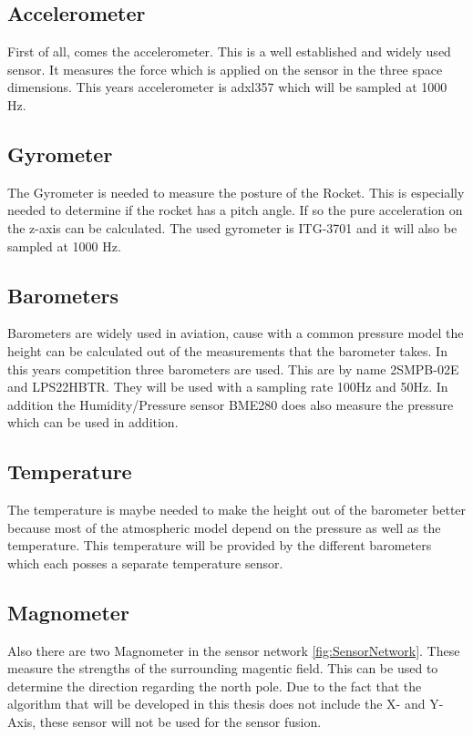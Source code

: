  \subsection{Accelerometer}
 First of all, comes the accelerometer. This is a well established and widely used sensor. It measures the force which is applied on the sensor in the three
 space dimensions. 
 This years accelerometer is adxl357 which will be sampled at 1000 Hz. 
 
 \subsection{Gyrometer}
 The Gyrometer is needed to measure the posture of the Rocket. This is especially needed to determine if the rocket has a pitch angle. If so the pure
 acceleration on the z-axis can be calculated. The used gyrometer is ITG-3701 and it will also be sampled at 1000 Hz.
 
 \subsection{Barometers}
 Barometers are widely used in aviation, cause with a common pressure model the height can be calculated out of the measurements that the barometer takes.
 In this years competition three barometers are used. This are by name 2SMPB-02E and LPS22HBTR. They will be used with a sampling rate 100Hz and 50Hz. %
 In addition the Humidity/Pressure sensor BME280 does also measure the pressure which can be used in addition.
 
 \subsection{Temperature}
 The temperature is maybe needed to make the height out of the barometer better because most of the atmospheric model depend on the pressure as well as the temperature.
 This temperature will be provided by the different barometers which each posses a separate temperature sensor. 
 
 \subsection{Magnometer}
 Also there are two Magnometer in the sensor network \ref{fig:SensorNetwork}. These measure the strengths of the surrounding magentic field.
 This can be used to determine the direction regarding the north pole.
 Due to the fact that the algorithm that will be developed in this thesis does not include the X- and Y-Axis,
 these sensor will not be used for the sensor fusion.
 
